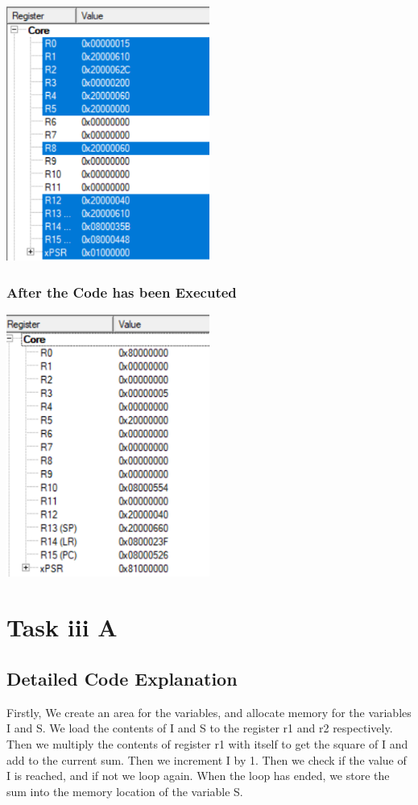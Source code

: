 \documentclass{article}
\begin{document}
\begin{center}
    \includegraphics[width=0.5\textwidth]{task_ii_before.png}
\end{center}

\subsubsection{After the Code has been Executed}

\begin{center}
    \includegraphics[width=0.5\textwidth]{task_ii_after.png}
\end{center}

\section{Task iii A}

\subsection{Detailed Code Explanation}
Firstly, We create an area for the variables, and allocate memory for the variables I and S. We load the contents of I and S to the register r1 and r2 respectively. Then we multiply the contents of register r1 with itself to get the square of I and add to the current sum. Then we increment I by 1. Then we check if the value of I is reached, and if not we loop again. When the loop has ended, we store the sum into the memory location of the variable S.
\end{document}

